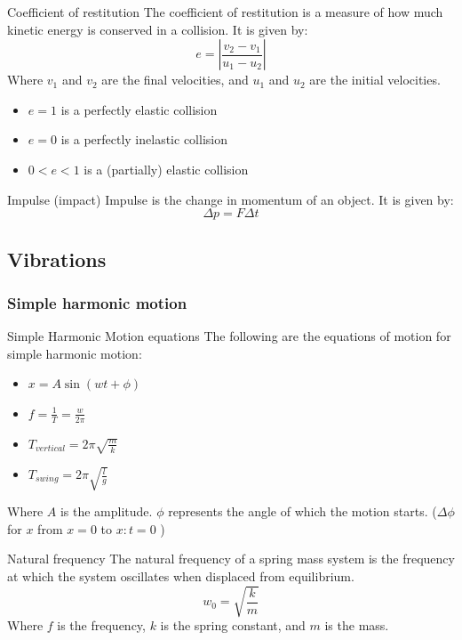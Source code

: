 \documentclass{article}
\begin{document}
\begin{theorem}
    {Coefficient of restitution}
    The coefficient of restitution is a measure of how much kinetic energy is conserved in a collision. It is given by:
    \[e=|\frac{v_{2}-v_{1}}{u_{1}-u_{2}}|\]
    Where $v_{1}$ and $v_{2}$ are the final velocities, and $u_{1}$ and $u_{2}$ are the initial velocities.
    \begin{itemize}
        \item $e=1$ is a perfectly elastic collision
        \item $e=0$ is a perfectly inelastic collision
        \item $0<e<1$ is a (partially) elastic collision
    \end{itemize}
\end{theorem}

\begin{definition}
    {Impulse (impact)}
    Impulse is the change in momentum of an object. It is given by:
    \[\Delta p=F\Delta t\]
\end{definition}

\subsection{Vibrations}

\subsubsection{Simple harmonic motion}
\begin{theorem}
    {Simple Harmonic Motion equations}
    The following are the equations of motion for simple harmonic motion:
    \begin{itemize}
        \item $x=A\sin(wt+\phi)$
        \item $f=\frac{1}{T}=\frac{w}{2\pi}$
        \item $T_{vertical} = 2\pi\sqrt{\frac{m}{k}}$
        \item $T_{swing} = 2\pi\sqrt{\frac{l}{g}}$
    \end{itemize}
    Where $A$ is the amplitude. $\phi$ represents the angle of which the motion starts. ($\Delta\phi$ for $x$ from $x=0$ to $x:t=0$ )
\end{theorem}

\begin{definition}
    {Natural frequency}
    The natural frequency of a spring mass system is the frequency at which the system oscillates when displaced from equilibrium.
    \[w_0=\sqrt{\frac{k}{m}}\]
    Where $f$ is the frequency, $k$ is the spring constant, and $m$ is the mass.
\end{definition}
\end{document}
